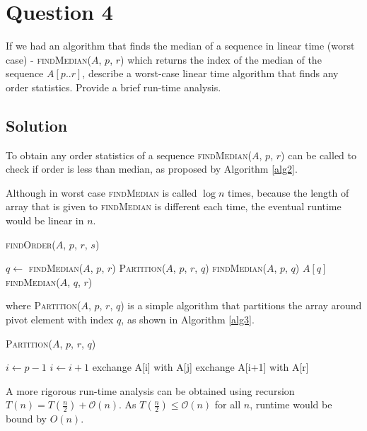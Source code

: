 
\section*{Question 4}

If we had an algorithm that finds the median of a sequence in linear time (worst case) - \textsc{findMedian($A$, $p$, $r$)} which returns the index of the median of the sequence $A[p..r]$, describe a worst-case linear time algorithm that finds any order statistics.
Provide a brief run-time analysis.

\subsection*{Solution}

To obtain any order statistics of a sequence \textsc{findMedian($A$, $p$, $r$)} can be called to check if order is less than median, as proposed by Algorithm \ref{alg2}.

Although in worst case \textsc{findMedian} is called $\log n$ times, because the length of array that is given to \textsc{findMedian} is different each time, the eventual runtime would be linear in $n$.

\begin{algorithm}[H]
\caption{\textsc{findOrder($A$, $p$, $r$, $s$)}}\label{alg2}
\begin{algorithmic}[1]
\State $q \leftarrow $ \textsc{findMedian($A$, $p$, $r$)}
\State \textsc{Partition($A$, $p$, $r$, $q$)}
\State \Return \textsc{findMedian($A$, $p$, $q$)}
\State \Return $A[q]$
\Else
\State \Return \textsc{findMedian($A$, $q$, $r$)}
\EndIf
\end{algorithmic}
\end{algorithm}

where \textsc{Partition($A$, $p$, $r$, $q$)} is a simple algorithm that partitions the array around pivot element with index $q$, as shown in Algorithm \ref{alg3}.

\begin{algorithm}[H]
\caption{\textsc{Partition($A$, $p$, $r$, $q$)}}\label{alg3}
\begin{algorithmic}[1]
\State $i \leftarrow p - 1 $
\State $i \leftarrow i + 1$
\State exchange A[i] with A[j]
\EndIf
\State exchange A[i+1] with A[r]
\EndFor
\end{algorithmic}
\end{algorithm}

A more rigorous run-time analysis can be obtained using recursion $T(n) = T(\frac{n}{2}) + \mathcal{O}(n)$.
As $T(\frac{n}{2}) \leq \mathcal{O}(n)$ for all $n$, runtime would be bound by $O(n)$.
